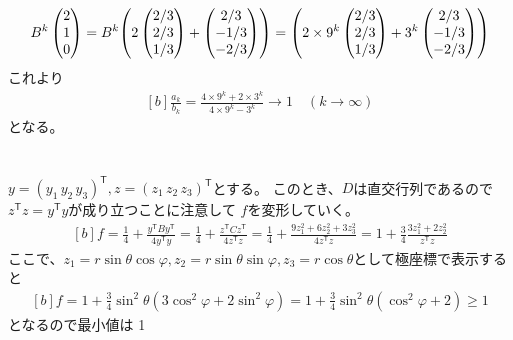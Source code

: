 \documentclass[../ap_2011.tex]{subfiles}
\begin{document}
\section{}
\begin{equation}\begin{aligned}[b]
    B^k\begin{pmatrix}
        2 \\1\\0
    \end{pmatrix}
    =B^k\qty(2\begin{pmatrix}
        2/3\\2/3\\1/3
    \end{pmatrix}
    +\begin{pmatrix}
        2/3\\-1/3\\-2/3
    \end{pmatrix})
    =\qty(2\times9^k\begin{pmatrix}
        2/3\\2/3\\1/3
    \end{pmatrix}
    +3^k\begin{pmatrix}
        2/3\\-1/3\\-2/3
    \end{pmatrix})
\end{aligned}\end{equation}
これより
\begin{equation}\begin{aligned}[b]
    \frac{a_k}{b_k}=\frac{4\times 9^k+2\times 3^k}{4\times 9^k- 3^k}\to 1\quad(k\to\infty)
\end{aligned}\end{equation}
となる。

\section{}
\(y=(y_1\,y_2\,y_3)^\mathsf{T}, z=(z_1\,z_2\,z_3)^\mathsf{T}\)とする。
このとき、\(D\)は直交行列であるので\(z^\mathsf{T}z=y^\mathsf{T}y\)が成り立つことに注意して
\(f\)を変形していく。
\begin{equation}\begin{aligned}[b]
    f
    =\frac{1}{4} +\frac{y^\mathsf{T} B y^\mathsf{T}}{4y^\mathsf{T}y}
    =\frac{1}{4} +\frac{z^\mathsf{T} C z^\mathsf{T}}{4z^\mathsf{T}z}
    =\frac{1}{4} +\frac{9z_1^2+6z_2^2+3z_3^2}{4z^\mathsf{T}z}
    = 1 +\frac{3}{4}\frac{3z_1^2+2z_2^2}{z^\mathsf{T}z}
\end{aligned}\end{equation}
ここで、\(z_1=r\sin\theta\cos\varphi,z_2=r\sin\theta\sin\varphi,z_3=r\cos\theta\)として極座標で表示すると
\begin{equation}\begin{aligned}[b]
    f=1+\frac{3}{4}\sin^2\theta(3\cos^2\varphi+2\sin^2\varphi)
    =1+\frac{3}{4}\sin^2\theta(\cos^2\varphi+2)\geq 1
\end{aligned}\end{equation}
となるので最小値は 1
\end{document}
